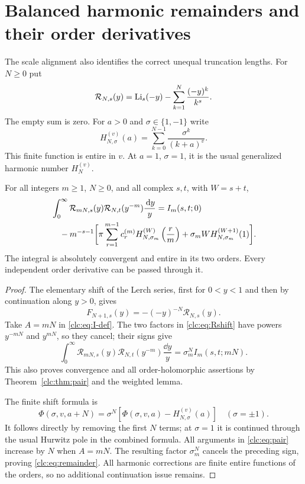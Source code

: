 \section{Balanced harmonic remainders and their order derivatives}
\label{clc:sec:harmonic}

The scale alignment also identifies the correct unequal truncation
lengths. For $N\ge0$ put
\begin{equation}\label{clc:eq:R}
 \mathcal R_{N,s}(y)=\operatorname{Li}_s(-y)-\sum_{k=1}^{N}\frac{(-y)^k}{k^s}.
\end{equation}
The empty sum is zero. For $a>0$ and $\sigma\in\{1,-1\}$ write
\begin{equation}\label{clc:eq:Hcolored}
 H_{N,\sigma}^{(v)}(a)=\sum_{k=0}^{N-1}\frac{\sigma^k}{(k+a)^v}.
\end{equation}
This finite function is entire in $v$. At $a=1$, $\sigma=1$, it is the
usual generalized harmonic number $H_N^{(v)}$.

\begin{theorem}
\label{clc:thm:remainder}
For all integers $m\ge1$, $N\ge0$, and all complex $s,t$, with $W=s+t$,
\begin{align}
 &\int_0^\infty\mathcal R_{mN,s}(y)
            \mathcal R_{N,t}(y^{-m})\frac{\,\mathrm d y}{y}
 = I_m(s,t;0)\notag\\
 &\quad-m^{-s-1}\biggl[
 \pi\sum_{r=1}^{m-1}c_r^{(m)}
 H_{N,\sigma_m}^{(W)}\left(\frac r m\right)
 +\sigma_m W H_{N,\sigma_m}^{(W+1)}(1)\biggr].
 \label{clc:eq:remainder}
\end{align}
The integral is absolutely convergent and entire in its two orders.
Every independent order derivative can be passed through it.
\end{theorem}
\begin{proof}
The elementary shift of the Lerch series, first for $0<y<1$ and then
by continuation along $y>0$, gives
\begin{equation}\label{clc:eq:Rshift}
 F_{N+1,s}(y)=-(-y)^{-N}\mathcal R_{N,s}(y).
\end{equation}
Take $A=mN$ in \eqref{clc:eq:I-def}. The two factors in
\eqref{clc:eq:Rshift} have powers $y^{-mN}$ and $y^{mN}$, so they
cancel; their signs give
\[
 \int_0^\infty\mathcal R_{mN,s}(y)
       \mathcal R_{N,t}(y^{-m})\frac{\dd y}{y}
 =\sigma_m^N I_m(s,t;mN).
\]
This also proves convergence and all order-holomorphic assertions by
Theorem~\ref{clc:thm:pair} and the weighted lemma.

The finite shift formula is
\[
 \Phi(\sigma,v,a+N)=\sigma^N
             [\Phi(\sigma,v,a)-H_{N,\sigma}^{(v)}(a)]
 \quad(\sigma=\pm1).
\]
It follows directly by removing the first $N$ terms; at $\sigma=1$
it is continued through the usual Hurwitz pole in the combined formula.
All arguments in \eqref{clc:eq:pair} increase by $N$ when $A=mN$.
The resulting factor $\sigma_m^N$ cancels the preceding sign, proving
\eqref{clc:eq:remainder}. All harmonic corrections are finite entire
functions of the orders, so no additional continuation issue remains.
\end{proof}

